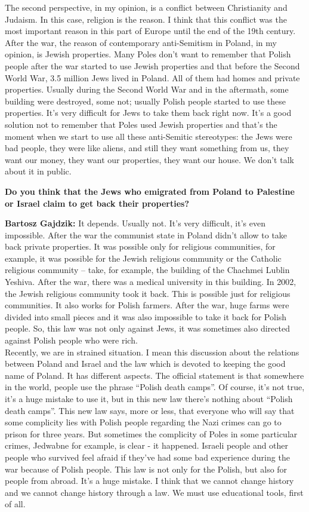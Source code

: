 The second perspective, in my opinion, is a conflict between Christianity and Judaism. In this case, religion is the reason. I think that this conflict was the most important reason in this part of Europe until the end of the 19th century. After the war, the reason of contemporary anti-Semitism in Poland, in my opinion, is Jewish properties. Many Poles don’t want to remember that Polish people after the war started to use Jewish properties and that before the Second World War, 3.5 million Jews lived in Poland. All of them had homes and private properties. Usually during the Second World War and in the aftermath, some building were destroyed, some not; usually Polish people started to use these properties. It’s very difficult for Jews to take them back right now. It’s a good solution not to remember that Poles used Jewish properties and that’s the moment when we start to use all these anti-Semitic stereotypes: the Jews were bad people, they were like aliens, and still they want something from us, they want our money, they want our properties, they want our house. We don’t talk about it in public. 

\textbf{Do you think that the Jews who emigrated from Poland to Palestine or Israel claim to get back their properties?} 

\textbf{Bartosz Gajdzik:} It depends. Usually not. It’s very difficult, it’s even impossible. After the war the communist state in Poland didn’t allow to take back private properties. It was possible only for religious communities, for example, it was possible for the Jewish religious community or the Catholic religious community – take, for example, the building of the Chachmei Lublin Yeshiva. After the war, there was a medical university in this building. In 2002, the Jewish religious community took it back. This is possible just for religious communities. It also works for Polish farmers. After the war, huge farms were divided into small pieces and it was also impossible to take it back for Polish people. So, this law was not only against Jews, it was sometimes also directed against Polish people who were rich.\\ 
Recently, we are in strained situation. I mean this discussion about the relations between Poland and Israel and the law which is devoted to keeping the good name of Poland. It has different aspects. The official statement is that somewhere in the world, people use the phrase ``Polish death camps''. Of course, it’s not true, it’s a huge mistake to use it, but in this new law there’s nothing about ``Polish death camps''. This new law says, more or less, that everyone who will say that some complicity lies with Polish people regarding the Nazi crimes can go to prison for three years. But sometimes the complicity of Poles in some particular crimes, Jedwabne for example, is clear - it happened. Israeli people and other people who survived feel afraid if they've had some bad experience during the war because of Polish people. This law is not only for the Polish, but also for people from abroad. It’s a huge mistake. I think that we cannot change history and we cannot change history through a law. We must use educational tools, first of all. 

